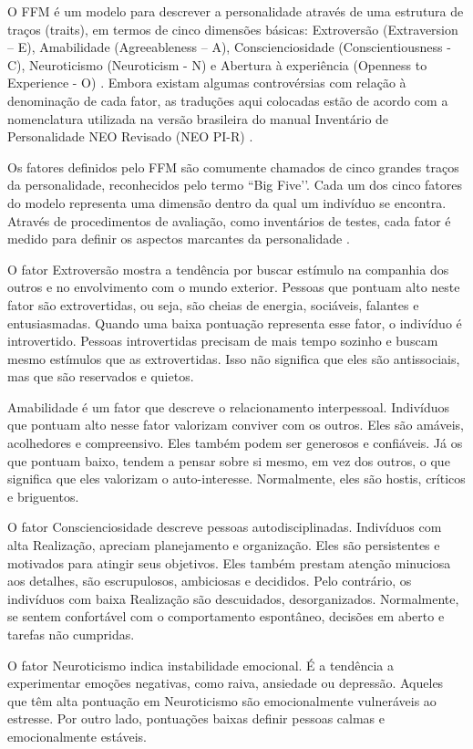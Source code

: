 O FFM é um modelo para descrever a personalidade através de uma estrutura de traços (traits), em termos de cinco dimensões básicas: Extroversão (Extraversion – E), Amabilidade (Agreeableness – A), Conscienciosidade (Conscientiousness - C), Neuroticismo (Neuroticism - N) e Abertura à experiência (Openness to Experience - O) \cite{mccrae:92}. Embora  existam  algumas  controvérsias com relação à denominação de cada fator, as traduções aqui colocadas estão de acordo com a nomenclatura utilizada na versão brasileira do manual Inventário de Personalidade NEO Revisado (NEO PI-R) \cite{flores:07}.

Os fatores definidos pelo FFM são comumente chamados de cinco grandes traços da personalidade, reconhecidos pelo termo ``Big Five’’. Cada um dos cinco fatores do modelo representa uma dimensão dentro da qual um indivíduo se encontra. Através de procedimentos de avaliação, como inventários de testes, cada fator é medido para definir os aspectos marcantes da personalidade \cite{costa:92b}.

O fator Extroversão mostra a tendência por buscar estímulo na companhia dos outros e no envolvimento com o mundo exterior. Pessoas que pontuam alto neste fator são extrovertidas, ou seja, são cheias de energia, sociáveis, falantes e entusiasmadas.  Quando uma baixa pontuação representa esse fator, o indivíduo é introvertido. Pessoas introvertidas precisam de mais tempo sozinho e buscam mesmo estímulos que as extrovertidas. Isso não significa que eles são antissociais, mas que são reservados e quietos.

Amabilidade é um fator que descreve o relacionamento interpessoal. Indivíduos que pontuam alto nesse fator valorizam conviver com os outros. Eles são amáveis, acolhedores e compreensivo. Eles também podem ser generosos e confiáveis. Já os que pontuam baixo, tendem a pensar sobre si mesmo, em vez dos outros, o que significa que eles valorizam o auto-interesse. Normalmente, eles são hostis, críticos e briguentos.

O fator Conscienciosidade descreve pessoas autodisciplinadas. Indivíduos com alta Realização, apreciam planejamento e organização. Eles são persistentes e motivados para atingir seus objetivos. Eles também prestam atenção minuciosa aos detalhes, são escrupulosos, ambiciosas e decididos. Pelo contrário, os indivíduos com baixa Realização são descuidados, desorganizados. Normalmente, se sentem confortável com o comportamento espontâneo, decisões em aberto e tarefas não cumpridas.

O fator Neuroticismo indica instabilidade emocional. É a tendência a experimentar emoções negativas, como raiva, ansiedade ou depressão. Aqueles que têm alta pontuação em Neuroticismo são emocionalmente vulneráveis ao estresse. Por outro lado, pontuações baixas definir pessoas calmas e emocionalmente estáveis.


